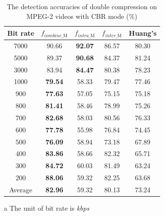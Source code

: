 \documentclass[journal,sort]{IEEEtran}
\begin{document}
\begin{table}
	\centering
	\caption{\label{mpeg2-cbr}The detection accuracies of double compression on MPEG-2 videos with CBR mode (\%)}
	\begin{tabular}{ccccc}
		\toprule
		Bit rate \tnote{a}& $f_{combine\_\text{M}}$ & $f_{intra\_\text{M}}$ & $f_{inter\_\text{M}}$& Huang's  \\\midrule
		7000 &90.66   &\textbf{92.07}   &86.57   & 80.30\\
		5000 &89.37   &\textbf{90.68}   &84.37   & 81.24\\
		3000 &83.94    &\textbf{84.47}   &80.38  & 78.23\\\midrule
		1000 &\textbf{79.54}    &58.33   &79.47  & 77.46\\
		900 &\textbf{77.63}   &57.05   &75.15   & 75.18\\
		800 &\textbf{81.41}   &58.46   &78.99   & 75.26\\
		700 &\textbf{82.68}   &58.03   &80.56   & 76.33\\
		600 &\textbf{77.78}   &55.98   &76.84   & 74.45\\
		500 &\textbf{76.09}   &58.94   &73.18   & 67.89\\
		400 &\textbf{83.86}   &58.66   &82.32   & 65.71\\\midrule
		300 &\textbf{84.72}   &60.03   &81.49   & 63.24\\
		200 &\textbf{88.06}   &59.32   &82.25  & 63.68\\\midrule
		Average &\textbf{82.96}   &59.32   &80.13  & 73.24\\\bottomrule
	\end{tabular}
	\begin{tablenotes}
	\footnotesize
	\item[a] The unit of bit rate is \emph{kbps}
	\end{tablenotes}
\end{table}
\end{document}
